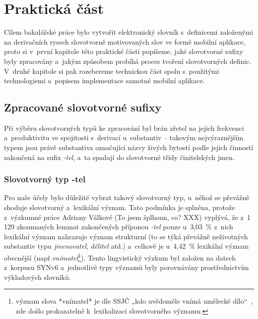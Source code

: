\part{Praktická část}

Cílem bakalářské práce bylo vytvořit elektronický slovník s~definicemi
založenými na derivačních rysech slovotvorně motivovaných slov ve formě
mobilní aplikace, proto si v~první kapitole této praktické části
popíšeme, jaké slovotvorné sufixy byly zpracovány a~jakým způsobem
probíhá proces tvoření slovotvorných definic. V~druhé kapitole si pak
rozebereme technickou část spolu s~použitými technologiemi a~popisem
implementace samotné mobilní aplikace.

\hypertarget{zpracovanuxe9-slovotvornuxe9-sufixy}{%
\chapter{Zpracované slovotvorné
sufixy}\label{zpracovanuxe9-slovotvornuxe9-sufixy}}

Při výběru slovotvorných typů ke zpracování byl brán zřetel na jejich
frekvenci a~produktivitu ve spojitosti s~derivací u~substantiv --
takovým nejvýraznějším typem jsou právě substantiva označující názvy
živých bytostí podle jejich činností zakončená na sufix \emph{-tel},
a~ta spadají do slovotvorné třídy činitelských jmen.
\parencite[17]{dokulil67}

\hypertarget{slovotvornuxfd-typ--tel}{%
\section{Slovotvorný typ -tel}\label{slovotvornuxfd-typ--tel}}

Pro naše účely bylo důležité vybrat takový slovotvorný typ, u~něhož se
převážně shoduje slovotvorný a~lexikální význam. Tato podmínka je
splněna, protože z~výzkumné práce Adriany Válkové (To jsem šplhoun, co?
XXX) vyplývá, že z~1 129 zkoumaných lemmat zakončených příponou
\emph{-tel} pouze u~3,03~\% z~nich lexikální význam nahrazuje význam
strukturní (to se týká převážně neživotných substantiv typu
\emph{jmenovatel}, \emph{dělitel} atd.) a~celkově je u~4,42~\% lexikální
význam obecnější
(např.\emph{vnímatel}\footnote{význam slova *vnímatel* je dle SSJČ „kdo uvědoměle vnímá umělecké dílo“~\parencite{ssjc}, zde došlo prokazatelně k~lexikalizaci slovotvorného významu.}).
Tento lingvistický výzkum byl založen na datech z~korpusu SYNv6
a~jednotlivé typy významů byly porovnávány prostřednictvím výkladových
slovníků. 

